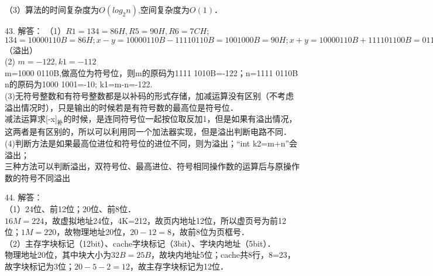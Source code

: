 （3）算法的时间复杂度为$O(log_2n)$,空间复杂度为$O(1)$．


43. 解答：
（1）$R1=134=86H, R5=90H, R6=7CH;$ \\
$134=1000 0110B=86H; x-y=1000 0110B-1111 0110B=1001 000B=90H; x+y=1000 0110B+1111 01100B=0111 1100B$（溢出） \\
(2) $m=-122, k1=-112$ \\
m=1000 0110B,做高位为符号位，则m的原码为1111 1010B=-122；n=1111 0110B \\
n的原码为1000 1001=-10; k1=m-n=-122. \\
(3)无符号整数和有符号整数都是以补码的形式存储，加减运算没有区别（不考虑溢出情况时），只是输出的时候若是有符号数的最高位是符号位． \\
减法运算求[-x]$_\text{补}$的时候，是连同符号位一起按位取反加1，但是如果有溢出情况，这两者是有区别的，所以可以利用同一个加法器实现，但是溢出判断电路不同． \\
(4)判断方法是如果最高位进位和符号位的进位不同，则为溢出；“int k2=m+n”会溢出； \\
三种方法可以判断溢出，双符号位、最高进位、符号相同操作数的运算后与原操作数的符号不同溢出

44. 解答： \\
（1）24位、前12位；20位、前8位． \\
$16M=224$，故虚拟地址24位，4K=212，故页内地址12位，所以虚页号为前12位；$1M=220$，故物理地址20位，$20-12=8$，故前8位为页框号． \\
（2）主存字块标记（12bit）、cache字块标记（3bit）、字块内地址（5bit）． \\
物理地址20位，其中块大小为$32B=25B$，故块内地址5位；cache共8行，8=23，故字块标记为3位；$20-5-2=12$，故主存字块标记为12位．